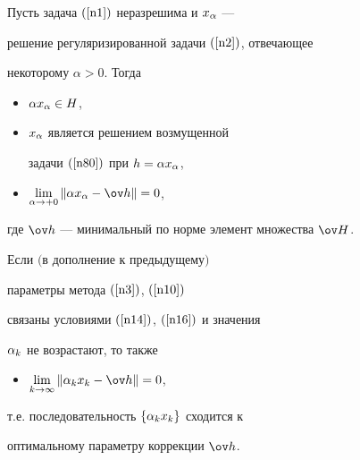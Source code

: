 \begin{thm}


Пусть задача $(\ref{n1})$ неразрешима и $x_{\alpha}$ ---


решение регуляризированной задачи $(\ref{n2})$, отвечающее


некоторому $\alpha>0$. Тогда


\begin{itemize}


\item[(a)] $\alpha x_{\alpha}\in H$,


\item[(b)] $x_{\alpha}$ является решением возмущенной


задачи $(\ref{n80})$ при $h=\alpha x_{\alpha}$,


\item[(c)] $\lim\limits_{\alpha\to+0}


\|\alpha\xa-\ov h\|=0$,


\end{itemize}


где $\ov h$ --- минимальный по норме элемент множества $\ov H$.





Если $($в дополнение к предыдущему$)$


параметры метода $(\ref{n3})$, $(\ref{n10})$


связаны условиями $(\ref{n14})$, $(\ref{n16})$ и значения


$\alpha_k$ не возрастают, то также


\begin{itemize}


\item[(d)] $\lim\limits_{k\to\infty}


\|\ak x_k-\ov h\|=0$,


\end{itemize}


т.е. последовательность $\{\alpha_k x_k\}$ сходится к


оптимальному параметру коррекции $\ov h$.


\end{thm}






